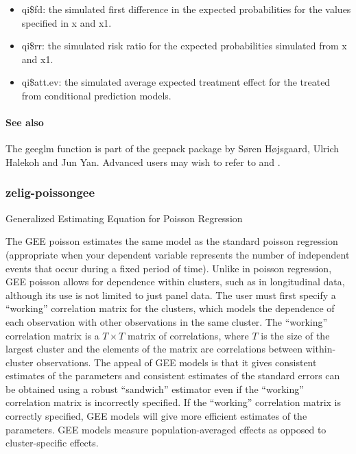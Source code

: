 \documentclass[letterpaper,10pt,english]{sphinxmanual}
\begin{document}
\begin{itemize}
\begin{itemize}
\item {} 
qi\$fd: the simulated first difference in the expected
probabilities for the values specified in x and x1.

\item {} 
qi\$rr: the simulated risk ratio for the expected probabilities
simulated from x and x1.

\item {} 
qi\$att.ev: the simulated average expected treatment effect for the
treated from conditional prediction models.

\end{itemize}

\end{itemize}


\paragraph{See also}
\label{zelig-probitgee:see-also}
The geeglm function is part of the geepack package by Søren Højsgaard,
Ulrich Halekoh and Jun Yan. Advanced users may wish to refer
to  and .


\subsubsection{zelig-poissongee}
\label{zelig-poissongee:zelig-poissongee}\label{zelig-poissongee:zpoissongee}\label{zelig-poissongee::doc}
Generalized Estimating Equation for Poisson Regression

The GEE poisson estimates the same model as the standard poisson
regression (appropriate when your dependent variable represents the
number of independent events that occur during a fixed period of time).
Unlike in poisson regression, GEE poisson allows for dependence within
clusters, such as in longitudinal data, although its use is not limited
to just panel data. The user must first specify a “working” correlation
matrix for the clusters, which models the dependence of each observation
with other observations in the same cluster. The “working” correlation
matrix is a \(T \times T\) matrix of correlations, where \(T\)
is the size of the largest cluster and the elements of the matrix are
correlations between within-cluster observations. The appeal of GEE
models is that it gives consistent estimates of the parameters and
consistent estimates of the standard errors can be obtained using a
robust “sandwich” estimator even if the “working” correlation matrix is
incorrectly specified. If the “working” correlation matrix is correctly
specified, GEE models will give more efficient estimates of the
parameters. GEE models measure population-averaged effects as opposed to
cluster-specific effects.
\end{document}
